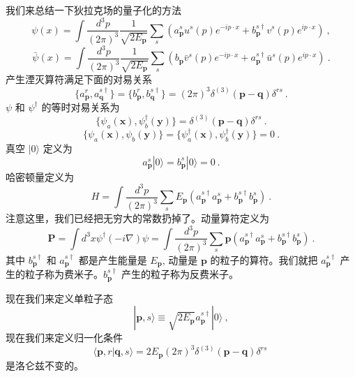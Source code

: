 
我们来总结一下狄拉克场的量子化的方法
\begin{equation}
\psi(x) = \int \frac{d^3 p}{(2\pi)^3} \frac{1}{\sqrt{2 E_{\mathbf p}}} \sum_s (a_{\mathbf p}^s u^s (p) e^{-ip\cdot x} + b_{\mathbf p}^{s\dagger} v^s(p) e^{ip\cdot x})~,
\end{equation}
\begin{equation}
\bar \psi (x) = \int \frac{d^3 p}{(2\pi)^3} \frac{1}{\sqrt{2 E_{\mathbf p}}} \sum_s (b_{\mathbf p}\bar v ^s(p) e^{- i p\cdot x}+ a_{\mathbf p}^{s\dagger} \bar u^s(p)e^{i p \cdot x})~.
\end{equation}
产生湮灭算符满足下面的对易关系
\begin{equation}
\{a_{\mathbf p}^r,a_{\mathbf q}^{s\dagger}\} = \{b_{\mathbf p}^r,b_{\mathbf q}^{s\dagger}\} = (2\pi)^3\delta^{(3)}(\mathbf p - \mathbf q)\delta^{rs}~.
\end{equation}
$\psi$ 和 $\psi^\dagger$ 的等时对易关系为
\begin{equation}
\{\psi_a(\mathbf x),\psi_b^\dagger(\mathbf y)\} = \delta^{(3)}(\mathbf p - \mathbf q)\delta^{rs}~.
\end{equation}
\begin{equation}
\{\psi_a(\mathbf x),\psi_b(\mathbf y)\} = \{\psi_a^\dagger(\mathbf x),\psi_b^\dagger(\mathbf y)\} = 0 ~.
\end{equation}
真空 $|0\rangle$ 定义为
\begin{equation}
a_{\mathbf p }^s|0\rangle = b_{\mathbf p}^s|0\rangle = 0~.
\end{equation}
哈密顿量定义为
\begin{equation}
H = \int \frac{d^3p}{(2\pi)^3}\sum_s E_{\mathbf p} (a^{s\dagger}_{\mathbf p}a^{s}_{\mathbf p}+b^{s\dagger}_{\mathbf p}b_{\mathbf p}^s)~.
\end{equation}
注意这里，我们已经把无穷大的常数扔掉了。动量算符定义为
\begin{equation}
\mathbf P = \int d^3 x \psi^\dagger (-i\nabla)\psi = \int \frac{d^3 p}{(2\pi)^3} \sum_s \mathbf p (a_{\mathbf p}^{s\dagger} a_{\mathbf p}^s+b_{\mathbf p}^{s\dagger}b_{\mathbf p}^s)~.
\end{equation}
其中 $b_{\mathbf p}^{s\dagger}$ 和 $a_{\mathbf p}^{s\dagger}$ 都是产生能量是 $E_{\mathbf p}$, 动量是 $\mathbf p$ 的粒子的算符。我们就把 $a_{\mathbf p}^{s\dagger}$ 产生的粒子称为费米子。$b_{\mathbf p}^{s\dagger}$ 产生的粒子称为反费米子。

现在我们来定义单粒子态
\begin{equation}
|\mathbf p,s\rangle \equiv \sqrt{2 E_{\mathbf p}} a_{\mathbf p}^{s\dagger} | 0 \rangle ~,
\end{equation}
现在我们来定义归一化条件
\begin{equation}
\langle \mathbf p,r|\mathbf q,s\rangle = 2 E_{\mathbf p}(2\pi)^3\delta^{(3)}(\mathbf p - \mathbf q) \delta^{rs}~
\end{equation}
是洛仑兹不变的。


